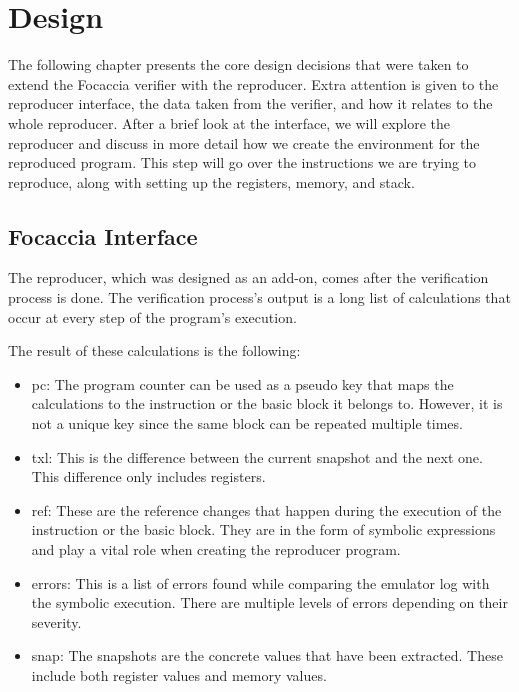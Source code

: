
\chapter{Design}\label{chapter:design}
The following chapter presents the core design decisions that were taken to extend the Focaccia verifier with the reproducer.
Extra attention is given to the reproducer interface, the data taken from the verifier, and how it relates to the whole reproducer.
After a brief look at the interface, we will explore the reproducer and discuss in more detail how we create the environment for the reproduced program.
This step will go over the instructions we are trying to reproduce, along with setting up the registers, memory, and stack.

\section{Focaccia Interface}
The reproducer, which was designed as an add-on, comes after the verification process is done.
The verification process's output is a long list of calculations that occur at every step of the program's execution.

The result of these calculations is the following:
\begin{itemize}
    \item pc: The program counter can be used as a pseudo key that maps the calculations to the instruction or the basic block it belongs to. However, it is not a unique key since the same block can be repeated multiple times.
    \item txl: This is the difference between the current snapshot and the next one. This difference only includes registers.
    \item ref: These are the reference changes that happen during the execution of the instruction or the basic block. They are in the form of symbolic expressions and play a vital role when creating the reproducer program.
    \item errors: This is a list of errors found while comparing the emulator log with the symbolic execution. There are multiple levels of errors depending on their severity.
    \item snap: The snapshots are the concrete values that have been extracted. These include both register values and memory values.
\end{itemize}

